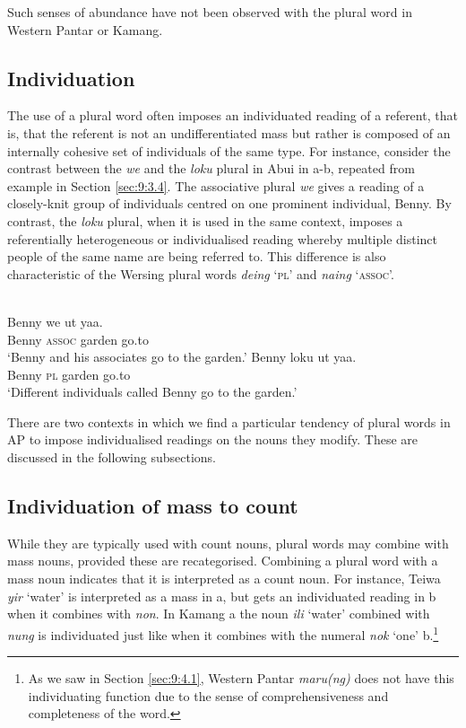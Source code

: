 Such senses of abundance have not been observed with the plural word in Western Pantar or Kamang.

\subsection{Individuation} %
\label{sec:9:4.3}
The use of a plural word often imposes an individuated reading of a referent, that is, that the referent is not an undifferentiated mass but rather is composed of an internally cohesive set of individuals of the same type. For instance, consider the contrast between the \textit{we} and the \textit{loku} plural in Abui in a-b, repeated from example  in Section \ref{sec:9:3.4}. The associative plural \textit{we} gives a reading of a closely-knit group of individuals centred on one prominent individual, Benny. By contrast, the \textit{loku} plural, when it is used in the same context, imposes a referentially heterogeneous or individualised reading whereby multiple distinct people of the same name are being referred to. This difference is also characteristic of the Wersing plural words \textit{deing} `\textsc{pl}' and \textit{naing} `\textsc{assoc}'.


\ea%
\label{ex:9:76}
 \\
\ea
\gll Benny w{e} ut yaa. \\
   Benny \textsc{assoc} garden go.to \\
\glt `Benny and his associates go to the garden.'
\ex
\gll Benny loku ut yaa.\\
  Benny \textsc{pl} garden go.to  \\
\glt  `Different individuals called Benny go to the garden.'
\z
\z





There are two contexts in which we find a particular tendency of plural words in AP to impose individualised readings on the nouns they modify. These are discussed in the following subsections.

\subsection{Individuation of mass to count}
While they are typically used with count nouns, plural words may combine with mass nouns, provided these are recategorised. Combining a plural word with a mass noun indicates that it is interpreted as a count noun. For instance, Teiwa \textit{yir} `water' is interpreted as a mass in a, but gets an individuated reading in b when it combines with \textit{non}. In Kamang a the noun \textit{ili} `water' combined with \textit{nung} is individuated just like when it combines with the numeral \textit{nok} `one' b.\footnote{ As we saw in Section \ref{sec:9:4.1}, Western Pantar \textit{maru(ng)} does not have this individuating function due to the sense of comprehensiveness and completeness of the word.}


